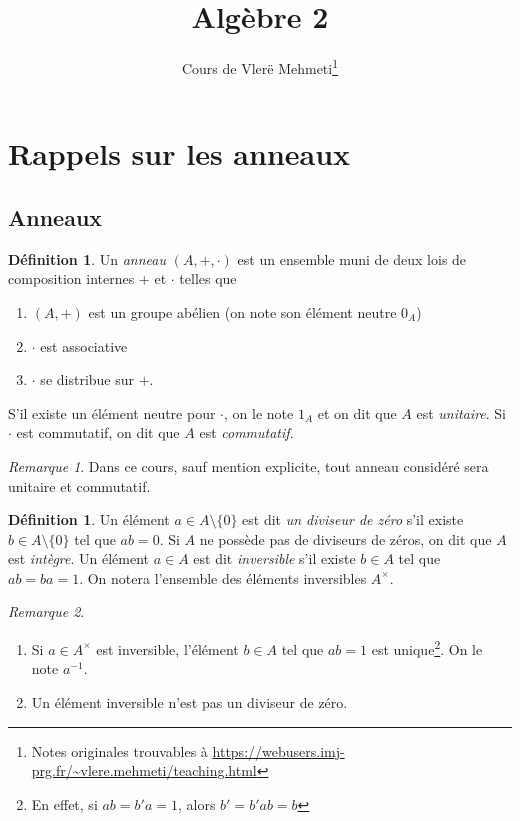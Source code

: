 \documentclass{article}
\title{Algèbre 2}
\author{Cours de Vlerë Mehmeti\footnote{Notes originales trouvables à \url{https://webusers.imj-prg.fr/~vlere.mehmeti/teaching.html}}}
\date{}
\theoremstyle{plain}
\theoremstyle{definition}
\newtheorem{definition}[theorem]{Définition}
\theoremstyle{remark}
\newtheorem*{remark}{Remarque}
\begin{document}
\maketitle

\setcounter{section}{-1}
\section{Rappels sur les anneaux}

\subsection{Anneaux}

\begin{definition}
    Un \emph{anneau} $(A,+,\cdot)$ est un ensemble muni de deux lois de composition internes $+$ et $\cdot$ telles que
    \begin{enumerate}
        \item $(A,+)$ est un groupe abélien (on note son élément neutre $0_A$)
        \item $\cdot$ est associative
        \item $\cdot$ se distribue sur $+$.
    \end{enumerate}
    S'il existe un élément neutre pour $\cdot$, on le note $1_A$ et on dit que $A$ est \emph{unitaire}. Si $\cdot$ est commutatif, on dit que $A$ est \emph{commutatif}. 
\end{definition}

\begin{remark}
    Dans ce cours, sauf mention explicite, tout anneau considéré sera unitaire et commutatif.
\end{remark}

\begin{definition}
    Un élément $a \in A \setminus\{0\}$ est dit \emph{un diviseur de zéro} s'il existe $b \in A \setminus \{0\}$ tel que $ab = 0$. Si $A$ ne possède pas de diviseurs de zéros, on dit que $A$ est \emph{intègre}. Un élément $a \in A$ est dit \emph{inversible} s'il existe $b \in A$ tel que $ab = ba = 1$. On notera l'ensemble des éléments inversibles $A^\times$.
\end{definition}

\begin{remark} \leavevmode
    \begin{enumerate}
        \item Si $a \in A^\times$ est inversible, l'élément $b \in A$ tel que $ab = 1$ est unique\footnote{En effet, si $ab = b'a = 1$, alors $b' = b'ab = b$}. On le note $a^{-1}$.
        \item Un élément inversible n'est pas un diviseur de zéro.
    \end{enumerate}
\end{remark}
\end{document}
